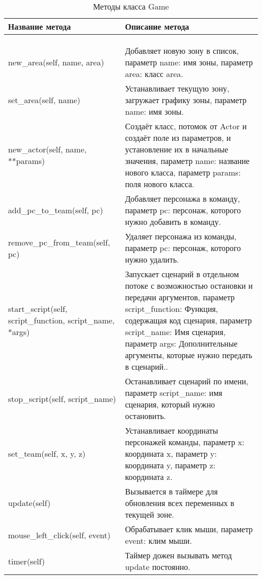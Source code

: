 \begin{xltabular}{\textwidth}{|X|X|}
	\caption{Методы класса Game}\label{table:Game_methods} \\
	\hline \centrow
	Название метода & \centrow  Описание метода \\
	\hline {} &  \\ \hline
	\endfirsthead
	\\
	\hline {} &  \\ \hline
	\finishhead
	new\_area(self, name, area) & Добавляет новую зону в список, параметр name: имя зоны, параметр area: класс area. \\
	\hline
	set\_area(self, name) & Устанавливает текущую зону, загружает графику зоны, параметр name: имя зоны. \\
	\hline
	new\_actor(self, name, **params) & Создаёт класс, потомок от Actor и создаёт поле из параметров, и установление их в начальные значения,
	параметр name: название нового класса, параметр params: поля нового класса. \\
	\hline
	add\_pc\_to\_team(self, pc) & Добавляет персонажа в команду, параметр pc: персонаж, которого нужно добавить в команду. \\
	\hline
	remove\_pc\_from\_team(self, pc) &  Удаляет персонажа из команды, параметр pc: персонаж, которого нужно удалить. \\
	\hline
	start\_script(self, script\_function, script\_name, *args) & Запускает сценарий в отдельном потоке с возможностью остановки и передачи аргументов,
	параметр script\_function: Функция, содержащая код сценария,
	параметр script\_name: Имя сценария,
	параметр args: Дополнительные аргументы, которые нужно передать в сценарий.. \\
	\hline
	stop\_script(self, script\_name) & Останавливает сценарий по имени, параметр script\_name: имя сценария, который нужно остановить. \\
	\hline
	set\_team(self, x, y, z) & Устанавливает координаты персонажей команды, параметр x: координата x, параметр y: координата y, параметр z: координата z. \\
	\hline
	update(self) & Вызывается в таймере для обновления всех переменных в текущей зоне. \\
	\hline
	mouse\_left\_click(self, event) & Обрабатывает клик мыши, параметр event: клим мыши. \\
	\hline
	timer(self) & Таймер дожен вызывать метод update постоянно. \\
	\hline
\end{xltabular}

